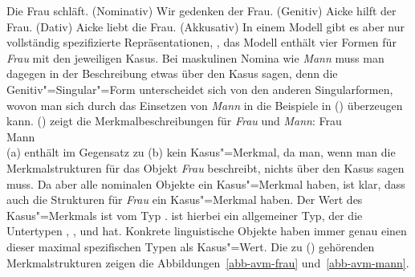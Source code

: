 \eal\jamwidth=6cm\relax
\ex Die Frau schläft.       \jam(Nominativ)
\ex Wir gedenken der Frau.  \jam(Genitiv)
\ex Aicke hilft der Frau.      \jam(Dativ)
\ex Aicke liebt die Frau.      \jam(Akkusativ)
\zl
In einem Modell gibt es aber nur vollständig spezifizierte Repräsentationen,
\dash, das Modell enthält vier Formen für \emph{Frau} mit den jeweiligen Kasus.
Bei maskulinen Nomina wie \emph{Mann} muss man dagegen in der Beschreibung
etwas über den Kasus sagen, denn die Genitiv"=Singular"=Form unterscheidet
sich von den anderen Singularformen, wovon man sich durch das Einsetzen
von \emph{Mann} in die Beispiele in () überzeugen kann. () zeigt die
Merkmalbeschreibungen für \emph{Frau} und \emph{Mann}:
\eal
\ex\label{avm-frau}
Frau\\
\ex\label{avm-mann}
Mann\\
\zl
(a) enthält im Gegensatz zu (b) kein Kasus"=Merkmal, da man, wenn man die
Merkmalstrukturen für das Objekt \emph{Frau} beschreibt, nichts über den Kasus sagen muss. Da aber
alle nominalen Objekte ein Kasus"=Merkmal haben, ist klar, dass auch die Strukturen für \emph{Frau}
ein Kasus"=Merkmal haben. Der Wert des Kasus"=Merkmals ist vom Typ .
 ist hierbei ein allgemeiner Typ, der die Untertypen , ,
 und  hat. Konkrete linguistische Objekte haben immer genau einen dieser
maximal spezifischen Typen als Kasus"=Wert. Die zu () gehörenden Merkmalstrukturen zeigen die
Abbildungen~\ref{abb-avm-frau} und~\ref{abb-avm-mann}.%
